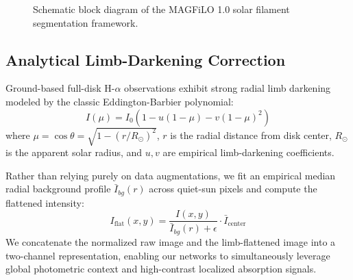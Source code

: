 \documentclass[conference]{IEEEtran}
\begin{document}
\begin{figure}[t]
\centering
{}
\caption{Schematic block diagram of the MAGFiLO 1.0 solar filament segmentation framework.}
\label{fig:architecture}
\end{figure}

\subsection{Analytical Limb-Darkening Correction}
Ground-based full-disk H-$\alpha$ observations exhibit strong radial limb darkening modeled by the classic Eddington-Barbier polynomial:
\begin{equation}
I(\mu) = I_0 \left( 1 - u(1 - \mu) - v(1 - \mu)^2 \right)
\end{equation}
where $\mu = \cos\theta = \sqrt{1 - (r/R_\odot)^2}$, $r$ is the radial distance from disk center, $R_\odot$ is the apparent solar radius, and $u, v$ are empirical limb-darkening coefficients. 

Rather than relying purely on data augmentations, we fit an empirical median radial background profile $\bar{I}_{bg}(r)$ across quiet-sun pixels and compute the flattened intensity:
\begin{equation}
I_{\text{flat}}(x, y) = \frac{I(x, y)}{\bar{I}_{bg}(r) + \epsilon} \cdot \bar{I}_{\text{center}}
\end{equation}
We concatenate the normalized raw image and the limb-flattened image into a two-channel representation, enabling our networks to simultaneously leverage global photometric context and high-contrast localized absorption signals.
\end{document}
